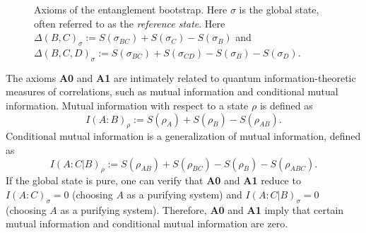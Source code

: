 \documentclass[12pt, nofootinbib]{article}
\theoremstyle{plain}
\theoremstyle{assumption}
\theoremstyle{definition}
\theoremstyle{plain}
\theoremstyle{plain}
\theoremstyle{plain}
\theoremstyle{plain}
\theoremstyle{plain}
\begin{document}
\begin{figure}[h]
    \centering
    \caption{Axioms of the entanglement bootstrap. Here $\sigma$ is the global state, often referred to as the \emph{reference state}. Here $\Delta(B,C)_{\sigma} := S(\sigma_{BC}) + S(\sigma_C) - S(\sigma_B)$ and $\Delta(B,C,D)_{\sigma} := S(\sigma_{BC}) + S(\sigma_{CD}) - S(\sigma_B) - S(\sigma_D)$.}
    \label{fig:eb_axioms}
\end{figure}

The axioms \textbf{A0} and \textbf{A1} are intimately related to quantum information-theoretic measures of correlations, such as mutual information and conditional mutual information. Mutual information with respect to a state $\rho$ is defined as 
\begin{equation}
    I(A:B)_{\rho} := S(\rho_A)+ S(\rho_B) - S(\rho_{AB}).
\end{equation} 
Conditional mutual information is a generalization of mutual information, defined as 
\begin{equation}
    I(A:C|B)_{\rho} := S(\rho_{AB})+ S(\rho_{BC}) - S(\rho_B) - S(\rho_{ABC}).
\end{equation}
If the global state is pure, one can verify that \textbf{A0} and \textbf{A1} reduce to $I(A:C)_{\sigma}=0$ (choosing $A$ as a purifying system) and $I(A:C|B)_{\sigma}=0$ (choosing $A$ as a purifying system). Therefore, \textbf{A0} and \textbf{A1}  imply that certain mutual information and conditional mutual information are zero.
\end{document}
